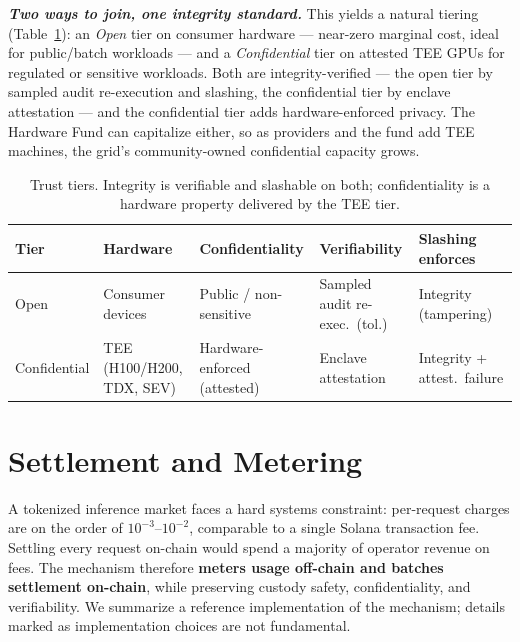 \documentclass[11pt]{article}
\newcommand{\ph}[1]{\textbf{\textit{#1}}}
\begin{document}
\ph{Two ways to join, one integrity standard.} This yields a natural tiering (Table~\ref{tab:tiers}): an \textit{Open} tier on consumer hardware --- near-zero marginal cost, ideal for public/batch workloads --- and a \textit{Confidential} tier on attested TEE GPUs for regulated or sensitive workloads. Both are integrity-verified --- the open tier by sampled audit re-execution and slashing, the confidential tier by enclave attestation --- and the confidential tier adds hardware-enforced privacy. The Hardware Fund can capitalize either, so as providers and the fund add TEE machines, the grid's community-owned confidential capacity grows.

\begin{table}[t]\centering\small
\begin{tabular}{@{}lllll@{}}
\toprule
\textbf{Tier} & \textbf{Hardware} & \textbf{Confidentiality} & \textbf{Verifiability} & \textbf{Slashing enforces}\\
\midrule
Open & Consumer devices & Public / non-sensitive & Sampled audit re-exec.\ (tol.) & Integrity (tampering)\\
Confidential & TEE (H100/H200, TDX, SEV) & Hardware-enforced (attested) & Enclave attestation & Integrity + attest.\ failure\\
\bottomrule
\end{tabular}
\caption{Trust tiers. Integrity is verifiable and slashable on both; confidentiality is a hardware property delivered by the TEE tier.}
\label{tab:tiers}
\end{table}

\section{Settlement and Metering}
A tokenized inference market faces a hard systems constraint: per-request charges are on the order of $10^{-3}$--$10^{-2}$, comparable to a single Solana transaction fee. Settling every request on-chain would spend a majority of operator revenue on fees. The mechanism therefore \textbf{meters usage off-chain and batches settlement on-chain}, while preserving custody safety, confidentiality, and verifiability. We summarize a reference implementation of the mechanism; details marked as implementation choices are not fundamental.
\end{document}
